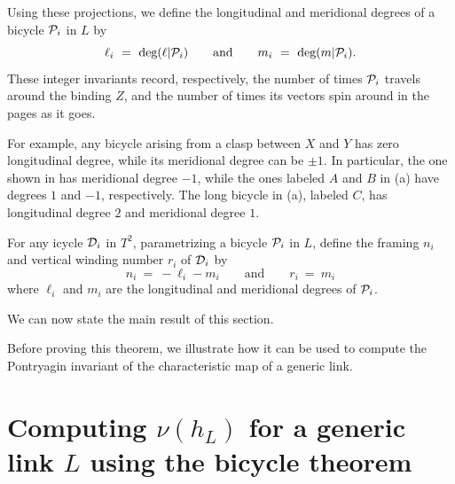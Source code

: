 Using these projections, we define the {\itb longitudinal} and {\itb meridional degrees} of a bicycle $\mathcal P_i$ in $L$ by  
$$
\ell_i \ = \ \textup{deg}(\ell|\mathcal P_i) \qquad\text{and}\qquad  m_i \ = \ \textup{deg}(m|\mathcal P_i). \label{degrees}
$$
These integer invariants record, respectively, the number of times $\mathcal P_i$ travels around the binding $Z$, and the number of times its vectors spin around in the pages as it goes.   

For example, any bicycle arising from a clasp between $X$ and $Y$ has zero longitudinal degree, while its meridional degree can be $\pm1$.  In particular, the one shown in  has meridional degree $-1$, while the ones labeled $A$ and $B$ in (a) have degrees $1$ and $-1$, respectively.  The long bicycle in (a), labeled $C$, has longitudinal degree $2$ and meridional degree $1$.  

For any icycle $\mathcal D_i$ in $T^2$, parametrizing a bicycle $\mathcal P_i$ in $L$, define the {\itb framing} $n_i$ and {\itb vertical winding number} $r_i$ of $\mathcal D_i$ by
$$
n_i \ = \ -\ell_i-m_i \qquad\text{and}\qquad r_i \ = \ m_i 
$$
where $\ell_i$ and $m_i$ are the longitudinal and meridional degrees of $\mathcal P_i$.

We can now state the main result of this section.



Before proving this theorem, we illustrate how it can be used to compute the Pontryagin invariant of the characteristic map of a generic link.

\part{Computing $\nu(h_L)$ for a generic link $L$ using the bicycle theorem}



